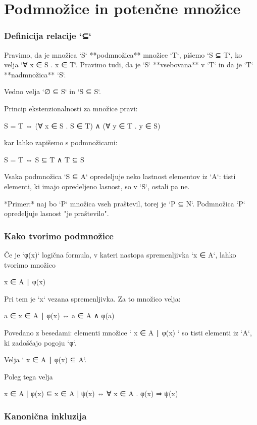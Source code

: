 \chapter{Podmnožice in potenčne množice}

\subsection{Definicija relacije `⊆`}

Pravimo, da je množica `S` **podmnožica** množice `T`, pišemo `S ⊆ T`, ko velja
`∀ x ∈ S . x ∈ T`. Pravimo tudi, da je `S` **vsebovana** v `T` in da je `T`
**nadmnožica** `S`.

Vedno velja `∅ ⊆ S` in `S ⊆ S`.

Princip ekstenzionalnosti za množice pravi:

    S = T ⇔ (∀ x ∈ S . S ∈ T) ∧ (∀ y ∈ T . y ∈ S)

kar lahko zapišemo s podmnožicami:

    S = T ⇔ S ⊆ T ∧ T ⊆ S

Vsaka podmnožica `S ⊆ A` opredeljuje neko lastnost elementov iz `A`: tisti
elementi, ki imajo opredeljeno lasnost, so v `S`, ostali pa ne.

*Primer:* naj bo `P` množica vseh praštevil, torej je `P ⊆ N`. Podmnožica `P`
opredeljuje lasnost "je praštevilo".

\subsection{Kako tvorimo podmnožice}

Če je `φ(x)` logična formula, v kateri nastopa spremenljivka `x ∈ A`, lahko tvorimo množico

    { x ∈ A ∣ φ(x) }

Pri tem je `x` vezana spremenljivka. Za to množico velja:

    a ∈ { x ∈ A ∣ φ(x) } ⇔ a ∈ A ∧ φ(a)

Povedano z besedami: elementi množice `{ x ∈ A ∣ φ(x) }` so tisti elementi iz `A`, ki zadoščajo pogoju `φ`.

Velja `{ x ∈ A ∣ φ(x) } ⊆ A`.

Poleg tega velja

    {x ∈ A | φ(x)} ⊆ {x ∈ A | ψ(x)} ⇔ ∀ x ∈ A . φ(x) ⇒ ψ(x)

\subsection{Kanonična inkluzija}

